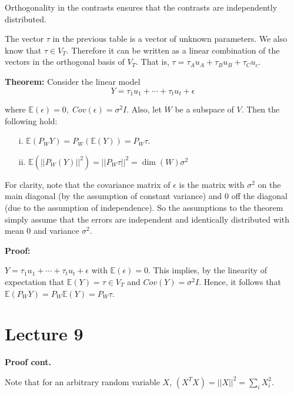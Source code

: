 \documentclass{tufte-book}
\begin{document}
Orthogonality in the contrasts ensures that the contrasts are independently distributed. 

The vector $\tau$ in the previous table is a vector of unknown parameters. We also know that $\tau \in V_{T}$. 
Therefore it can be written as a linear combination of the vectors in the orthogonal basis of $V_{T}$. That is,
$\tau = \tau_{A} u_{A} + \tau_{B} u_{B} + \tau_{C} u_{c}$.

\textbf{Theorem: } Consider the linear model
\begin{equation}
Y = \tau_{1} u_{1} + \cdots + \tau_{t} u_{t} + \epsilon
\end{equation}

where $\mathbb{E}(\epsilon) = 0, \; Cov(\epsilon) = \sigma^{2}I$. Also, let $W$ be a subspace of $V$. Then the following hold:

\begin{itemize}

  \item[i.] $\mathbb{E} (P_{W} Y) = P_{W} (\mathbb{E}(Y)) = P_{W}\tau$.
  \item[ii. ] $\mathbb{E}(||P_{W} (Y)||^{2}) = ||P_{W} \tau||^{2} = \dim (W) \sigma^{2}$

\end{itemize}

For clarity, note that the covariance matrix of $\epsilon$ is the matrix with $\sigma^{2}$ on the main diagonal 
(by the assumption of constant variance) and 0 off the diagonal (due to the assumption of independence). So the assumptions to 
the theorem simply assume that the errors are independent and identically distributed with mean 0 and variance $\sigma^{2}$.\newline

\textbf{Proof: }

$Y = \tau_{1} u_{1} + \cdots + \tau_{t} u_{t} + \epsilon$ with $\mathbb{E} (\epsilon) = 0$. This implies, by the linearity
of expectation that $\mathbb{E} (Y) = \tau \in V_{T}$ and $Cov(Y) = \sigma^{2}I$. Hence, it follows that 
$\mathbb{E} (P_{W}Y) = P_{W} \mathbb{E}(Y) = P_{W} \tau$.

\section{Lecture 9}

\textbf{Proof cont. }

Note that for an arbitrary random variable $X$, $(X^{T}X) = ||X||^{2} = \sum_{i} X_{i}^{2}$. 
\end{document}
